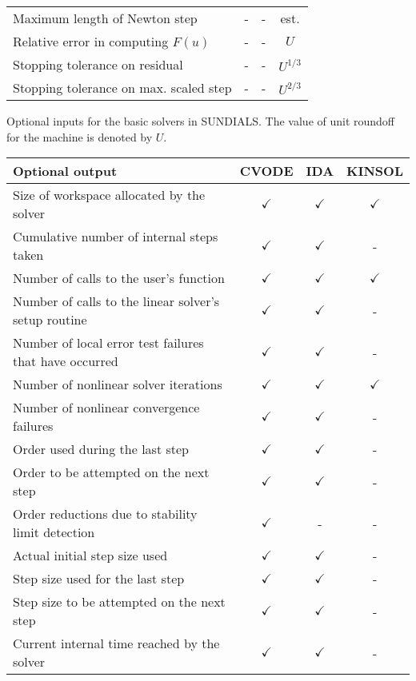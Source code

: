 \begin{acmtable}{340pt}
\begin{tabular}{p{2.75in} c c c }
Maximum length of Newton step & - & - & est. \\
Relative error in computing $F(u)$ & - & - & $U$ \\
Stopping tolerance on residual & - & - & $U^{1/3}$ \\
Stopping tolerance on max. scaled step & - & - & $U^{2/3}$ \\
\end{tabular}
\caption{Optional inputs for the basic solvers in SUNDIALS. 
The value of unit roundoff for the machine is denoted by $U$.}
\label{t:optional_input}
\end{acmtable}

\begin{acmtable}{327pt}
\centering
\begin{tabular}{p{2.75in} c c c }
Optional output & CVODE  & IDA & KINSOL \\
\hline
Size of workspace allocated by the solver & $\checkmark$ & $\checkmark$ & $\checkmark$ \\
Cumulative number of internal steps taken & $\checkmark$ & $\checkmark$ & - \\
Number of calls to the user's function & $\checkmark$ & $\checkmark$ & $\checkmark$ \\
Number of calls to the linear solver's setup routine & $\checkmark$ & $\checkmark$ & - \\
Number of local error test failures that have occurred & $\checkmark$ & $\checkmark$ & - \\
Number of nonlinear solver iterations & $\checkmark$ & $\checkmark$ & $\checkmark$ \\
Number of nonlinear convergence failures & $\checkmark$ & $\checkmark$ & - \\
Order used during the last step & $\checkmark$ & $\checkmark$ & - \\
Order to be attempted on the next step & $\checkmark$ & $\checkmark$ & - \\
Order reductions due to stability limit detection & $\checkmark$ & - & - \\
Actual initial step size used & $\checkmark$ & $\checkmark$ & - \\
Step size used for the last step & $\checkmark$ & $\checkmark$ & - \\
Step size to be attempted on the next step & $\checkmark$ & $\checkmark$ & - \\
Current internal time reached by the solver & $\checkmark$ & $\checkmark$ & - \\

\end{tabular}
\end{acmtable}
